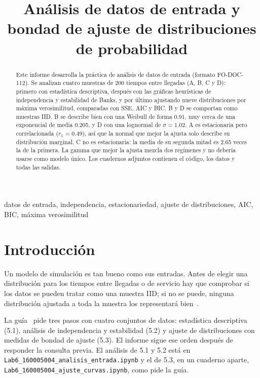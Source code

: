 \documentclass[conference]{IEEEtran}
\begin{document}
\title{Análisis de datos de entrada y bondad de ajuste de distribuciones de probabilidad}

\author{
}

\maketitle

\begin{abstract}
Este informe desarrolla la práctica de análisis de datos de entrada (formato FO-DOC-112). Se analizan cuatro muestras de 200 tiempos entre llegadas (A, B, C y D): primero con estadística descriptiva, después con las gráficas heurísticas de independencia y estabilidad de Banks, y por último ajustando nueve distribuciones por máxima verosimilitud, comparadas con SSE, AIC y BIC. B y D se comportan como muestras IID. B se describe bien con una Weibull de forma $0.91$, muy cerca de una exponencial de media 0.205, y D con una lognormal de $\sigma=1.02$. A es estacionaria pero correlacionada ($r_1=0.49$), así que la normal que mejor la ajusta solo describe su distribución marginal. C no es estacionaria: la media de su segunda mitad es 2.65 veces la de la primera. La gamma que mejor la ajusta mezcla dos regímenes y no debería usarse como modelo único. Los cuadernos adjuntos contienen el código, los datos y todas las salidas.
\end{abstract}

\begin{IEEEkeywords}
datos de entrada, independencia, estacionariedad, ajuste de distribuciones, AIC, BIC, máxima verosimilitud
\end{IEEEkeywords}

\section{Introducción}
Un modelo de simulación es tan bueno como sus entradas. Antes de elegir una distribución para los tiempos entre llegadas o de servicio hay que comprobar si los datos se pueden tratar como una muestra IID; si no se puede, ninguna distribución ajustada a toda la muestra los representará bien~\cite{banks98}.

La guía~\cite{guia} pide tres pasos con cuatro conjuntos de datos: estadística descriptiva (5.1), análisis de independencia y estabilidad (5.2) y ajuste de distribuciones con medidas de bondad de ajuste (5.3). El informe sigue ese orden después de responder la consulta previa. El análisis de 5.1 y 5.2 está en \texttt{Lab6\_160005004\_analisis\_entrada.ipynb} y el de 5.3, en un cuaderno aparte, \texttt{Lab6\_160005004\_ajuste\_curvas.ipynb}, como pide la guía.
\end{document}
